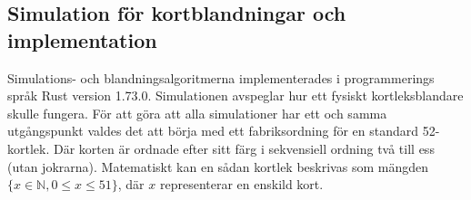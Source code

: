 \documentclass[swedish,a4paper]{article}
\begin{document}



\subsection{Simulation för kortblandningar och implementation}
Simulations- och blandningsalgoritmerna implementerades i programmerings
språk Rust version 1.73.0. 
Simulationen avspeglar hur ett fysiskt
kortleksblandare skulle fungera. För att göra att alla simulationer har
ett och samma utgångspunkt valdes det att börja med ett fabriksordning
för en standard 52-kortlek. Där korten är ordnade efter sitt färg i
sekvensiell ordning två till ess (utan jokrarna). Matematiskt kan en
sådan kortlek beskrivas som mängden $\{x \in \mathbb{N},  0 \leq x \leq 51
\}$, där $x$ representerar en enskild kort. 


\end{document}
